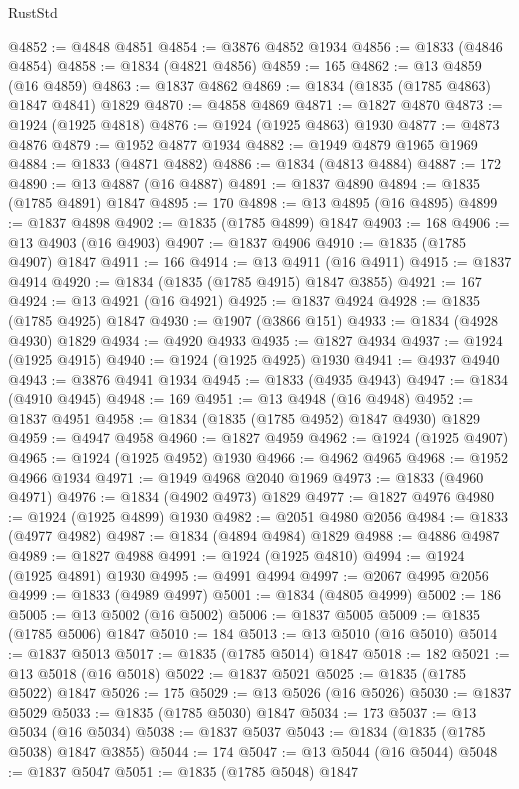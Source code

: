 \begin{lexlean}{RustStd}
\begin{coremodule}
@4852 := @4848 @4851
@4854 := @3876 @4852 @1934
@4856 := @1833 (@4846 @4854)
@4858 := @1834 (@4821 @4856)
@4859 := 165
@4862 := @13 @4859 (@16 @4859)
@4863 := @1837 @4862
@4869 := @1834 (@1835 (@1785 @4863) @1847 @4841) @1829
@4870 := @4858 @4869
@4871 := @1827 @4870
@4873 := @1924 (@1925 @4818)
@4876 := @1924 (@1925 @4863) @1930
@4877 := @4873 @4876
@4879 := @1952 @4877 @1934
@4882 := @1949 @4879 @1965 @1969
@4884 := @1833 (@4871 @4882)
@4886 := @1834 (@4813 @4884)
@4887 := 172
@4890 := @13 @4887 (@16 @4887)
@4891 := @1837 @4890
@4894 := @1835 (@1785 @4891) @1847
@4895 := 170
@4898 := @13 @4895 (@16 @4895)
@4899 := @1837 @4898
@4902 := @1835 (@1785 @4899) @1847
@4903 := 168
@4906 := @13 @4903 (@16 @4903)
@4907 := @1837 @4906
@4910 := @1835 (@1785 @4907) @1847
@4911 := 166
@4914 := @13 @4911 (@16 @4911)
@4915 := @1837 @4914
@4920 := @1834 (@1835 (@1785 @4915) @1847 @3855)
@4921 := 167
@4924 := @13 @4921 (@16 @4921)
@4925 := @1837 @4924
@4928 := @1835 (@1785 @4925) @1847
@4930 := @1907 (@3866 @151)
@4933 := @1834 (@4928 @4930) @1829
@4934 := @4920 @4933
@4935 := @1827 @4934
@4937 := @1924 (@1925 @4915)
@4940 := @1924 (@1925 @4925) @1930
@4941 := @4937 @4940
@4943 := @3876 @4941 @1934
@4945 := @1833 (@4935 @4943)
@4947 := @1834 (@4910 @4945)
@4948 := 169
@4951 := @13 @4948 (@16 @4948)
@4952 := @1837 @4951
@4958 := @1834 (@1835 (@1785 @4952) @1847 @4930) @1829
@4959 := @4947 @4958
@4960 := @1827 @4959
@4962 := @1924 (@1925 @4907)
@4965 := @1924 (@1925 @4952) @1930
@4966 := @4962 @4965
@4968 := @1952 @4966 @1934
@4971 := @1949 @4968 @2040 @1969
@4973 := @1833 (@4960 @4971)
@4976 := @1834 (@4902 @4973) @1829
@4977 := @1827 @4976
@4980 := @1924 (@1925 @4899) @1930
@4982 := @2051 @4980 @2056
@4984 := @1833 (@4977 @4982)
@4987 := @1834 (@4894 @4984) @1829
@4988 := @4886 @4987
@4989 := @1827 @4988
@4991 := @1924 (@1925 @4810)
@4994 := @1924 (@1925 @4891) @1930
@4995 := @4991 @4994
@4997 := @2067 @4995 @2056
@4999 := @1833 (@4989 @4997)
@5001 := @1834 (@4805 @4999)
@5002 := 186
@5005 := @13 @5002 (@16 @5002)
@5006 := @1837 @5005
@5009 := @1835 (@1785 @5006) @1847
@5010 := 184
@5013 := @13 @5010 (@16 @5010)
@5014 := @1837 @5013
@5017 := @1835 (@1785 @5014) @1847
@5018 := 182
@5021 := @13 @5018 (@16 @5018)
@5022 := @1837 @5021
@5025 := @1835 (@1785 @5022) @1847
@5026 := 175
@5029 := @13 @5026 (@16 @5026)
@5030 := @1837 @5029
@5033 := @1835 (@1785 @5030) @1847
@5034 := 173
@5037 := @13 @5034 (@16 @5034)
@5038 := @1837 @5037
@5043 := @1834 (@1835 (@1785 @5038) @1847 @3855)
@5044 := 174
@5047 := @13 @5044 (@16 @5044)
@5048 := @1837 @5047
@5051 := @1835 (@1785 @5048) @1847

\end{coremodule}
\end{lexlean}
